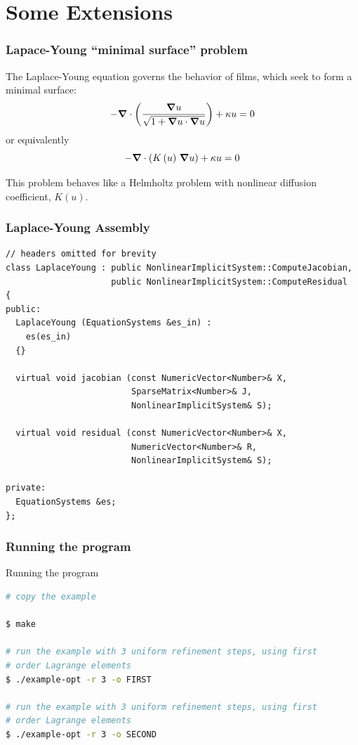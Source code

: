 \section{Some Extensions}






\frame
{
  \Large
  \begin{block}{}
  \end{block}
}

\frame
{
  \frametitle{Lapace-Young ``minimal surface'' problem}

  The Laplace-Young equation governs the behavior of films, which seek to form a minimal surface:
  \begin{equation*}
    -{\boldsymbol{\nabla}} {}\cdot\left(\frac{{\boldsymbol{\nabla}} {u}}{\sqrt{1 + {\boldsymbol{\nabla}} {u}\cdot{\boldsymbol{\nabla}} {u}}}\right) + \kappa u = 0
  \end{equation*}
  or equivalently
  \begin{equation*}
    -{\boldsymbol{\nabla}} {}\cdot\left(K\left(u\right)\,{\boldsymbol{\nabla}} {u}\right) + \kappa u = 0
  \end{equation*}
  
  This problem behaves like a Helmholtz problem with nonlinear diffusion coefficient, $K(u)$.
}

\begin{frame}
  \frametitle{Laplace-Young Assembly}
  \begin{lstlisting}
// headers omitted for brevity
class LaplaceYoung : public NonlinearImplicitSystem::ComputeJacobian,
                     public NonlinearImplicitSystem::ComputeResidual
{
public:  
  LaplaceYoung (EquationSystems &es_in) :
    es(es_in)
  {}

  virtual void jacobian (const NumericVector<Number>& X,
                         SparseMatrix<Number>& J,
                         NonlinearImplicitSystem& S);

  virtual void residual (const NumericVector<Number>& X,
                         NumericVector<Number>& R,
                         NonlinearImplicitSystem& S); 

private:
  EquationSystems &es;
};
  \end{lstlisting}
\end{frame}
\begin{frame}[fragile]
  \frametitle{Running the program}
    \begin{block}{Running the program}
    \begin{lstlisting}[language=bash]
# copy the example

$ make

# run the example with 3 uniform refinement steps, using first
# order Lagrange elements
$ ./example-opt -r 3 -o FIRST 

# run the example with 3 uniform refinement steps, using first
# order Lagrange elements
$ ./example-opt -r 3 -o SECOND
    \end{lstlisting}
  \end{block}
\end{frame}


